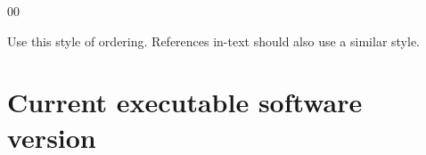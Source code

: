 \documentclass[preprint,12pt, a4paper]{elsarticle}
\begin{document}

\begin{thebibliography}{00}


\bibitem{} Use this style of ordering. References in-text should also use a similar style.

\end{thebibliography}


\section*{Current executable software version}
\label{}
\end{document}
